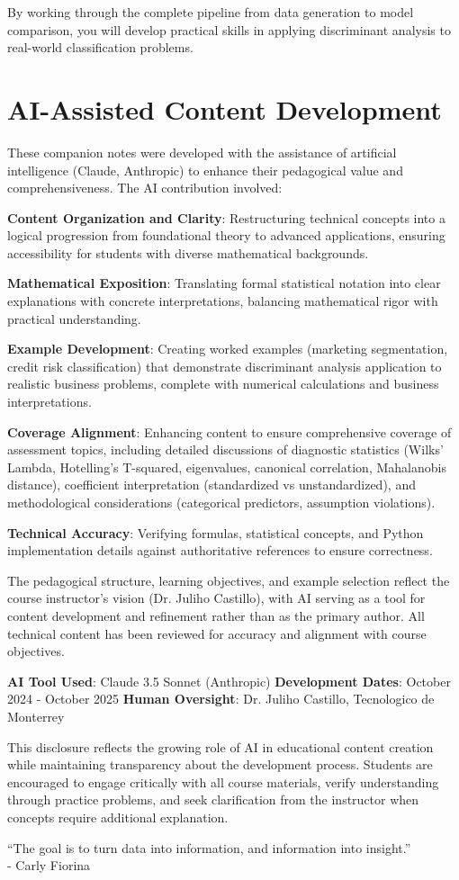 \documentclass[
]{article}
\begin{document}
By working through the complete pipeline from data generation to model
comparison, you will develop practical skills in applying discriminant
analysis to real-world classification problems.

\section{AI-Assisted Content Development}

These companion notes were developed with the assistance of artificial
intelligence (Claude, Anthropic) to enhance their pedagogical value and
comprehensiveness. The AI contribution involved:

\textbf{Content Organization and Clarity}: Restructuring technical
concepts into a logical progression from foundational theory to advanced
applications, ensuring accessibility for students with diverse
mathematical backgrounds.

\textbf{Mathematical Exposition}: Translating formal statistical
notation into clear explanations with concrete interpretations,
balancing mathematical rigor with practical understanding.

\textbf{Example Development}: Creating worked examples (marketing
segmentation, credit risk classification) that demonstrate discriminant
analysis application to realistic business problems, complete with
numerical calculations and business interpretations.

\textbf{Coverage Alignment}: Enhancing content to ensure comprehensive
coverage of assessment topics, including detailed discussions of
diagnostic statistics (Wilks' Lambda, Hotelling's T-squared,
eigenvalues, canonical correlation, Mahalanobis distance), coefficient
interpretation (standardized vs unstandardized), and methodological
considerations (categorical predictors, assumption violations).

\textbf{Technical Accuracy}: Verifying formulas, statistical concepts,
and Python implementation details against authoritative references to
ensure correctness.

The pedagogical structure, learning objectives, and example selection
reflect the course instructor's vision (Dr. Juliho Castillo), with AI
serving as a tool for content development and refinement rather than as
the primary author. All technical content has been reviewed for accuracy
and alignment with course objectives.

\textbf{AI Tool Used}: Claude 3.5 Sonnet (Anthropic) \textbf{Development
Dates}: October 2024 - October 2025 \textbf{Human Oversight}: Dr. Juliho
Castillo, Tecnologico de Monterrey

This disclosure reflects the growing role of AI in educational content
creation while maintaining transparency about the development process.
Students are encouraged to engage critically with all course materials,
verify understanding through practice problems, and seek clarification
from the instructor when concepts require additional explanation.

{ ``The goal is to turn data into information, and information into
insight.''\\
- Carly Fiorina }
\end{document}
